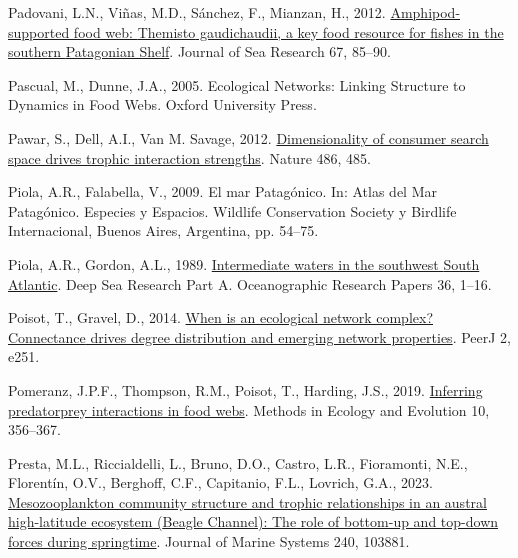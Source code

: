 \documentclass[preprint, 3p,
authoryear]{elsarticle} %
\newlength{\cslhangindent}
\newlength{\cslentryspacingunit} %
\newenvironment{CSLReferences}[2] %
 {%
  \setlength{\parindent}{0pt}
  \ifodd #1
  \let\oldpar\par
  \def\par{\hangindent=\cslhangindent\oldpar}
  \fi
  \setlength{\parskip}{#2\cslentryspacingunit}
 }%
 {}
\begin{document}
\begin{CSLReferences}{1}{0}
\leavevmode{}%
Padovani, L.N., Viñas, M.D., Sánchez, F., Mianzan, H., 2012.
\href{https://doi.org/10.1016/j.seares.2011.10.007}{Amphipod-supported
food web: {Themisto} gaudichaudii, a key food resource for fishes in the
southern {Patagonian Shelf}}. Journal of Sea Research 67, 85--90.

\leavevmode{}%
Pascual, M., Dunne, J.A., 2005. Ecological {Networks}: {Linking
Structure} to {Dynamics} in {Food Webs}. {Oxford University Press}.

\leavevmode{}%
Pawar, S., Dell, A.I., Van M. Savage, 2012.
\href{https://doi.org/10.1038/nature11131}{Dimensionality of consumer
search space drives trophic interaction strengths}. Nature 486, 485.

\leavevmode{}%
Piola, A.R., Falabella, V., 2009. {El mar Patagónico}. In: {Atlas del
Mar Patagónico. Especies y Espacios}. {Wildlife Conservation Society y
Birdlife Internacional}, {Buenos Aires, Argentina}, pp. 54--75.

\leavevmode{}%
Piola, A.R., Gordon, A.L., 1989.
\href{https://doi.org/10.1016/0198-0149(89)90015-0}{Intermediate waters
in the southwest {South Atlantic}}. Deep Sea Research Part A.
Oceanographic Research Papers 36, 1--16.

\leavevmode{}%
Poisot, T., Gravel, D., 2014.
\href{https://doi.org/10.7717/peerj.251}{When is an ecological network
complex? {Connectance} drives degree distribution and emerging network
properties}. PeerJ 2, e251.

\leavevmode{}%
Pomeranz, J.P.F., Thompson, R.M., Poisot, T., Harding, J.S., 2019.
\href{https://doi.org/10.1111/2041-210X.13125}{Inferring
predator\textendash prey interactions in food webs}. Methods in Ecology
and Evolution 10, 356--367.

\leavevmode{}%
Presta, M.L., Riccialdelli, L., Bruno, D.O., Castro, L.R., Fioramonti,
N.E., Florentín, O.V., Berghoff, C.F., Capitanio, F.L., Lovrich, G.A.,
2023.
\href{https://doi.org/10.1016/j.jmarsys.2023.103881}{Mesozooplankton
community structure and trophic relationships in an austral
high-latitude ecosystem ({Beagle Channel}): {The} role of bottom-up and
top-down forces during springtime}. Journal of Marine Systems 240,
103881.


\end{CSLReferences}
\end{document}
